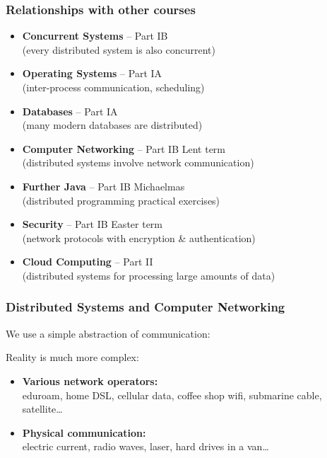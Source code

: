 \begin{frame}
    \label{s:other-courses}
    \frametitle{Relationships with other courses}
    \begin{itemize}
        \item \textbf{Concurrent Systems} -- Part IB\\
            (every distributed system is also concurrent)
        \item \textbf{Operating Systems} -- Part IA\\
            (inter-process communication, scheduling)
        \item \textbf{Databases} -- Part IA\\
            (many modern databases are distributed)
        \item \textbf{Computer Networking} -- Part IB Lent term\\
            (distributed systems involve network communication)
        \item \textbf{Further Java} -- Part IB Michaelmas\\
            (distributed programming practical exercises)
        \item \textbf{Security} -- Part IB Easter term\\
            (network protocols with encryption \& authentication)
        \item \textbf{Cloud Computing} -- Part II\\
            (distributed systems for processing large amounts of data)
    \end{itemize}
\end{frame}

\begin{frame}
    \label{s:networking}
    \frametitle{Distributed Systems and Computer Networking}
    We use a simple abstraction of communication:
    \begin{center}
    \end{center}

    Reality is much more complex:
    \begin{itemize}
        \item \textbf{Various network operators:}\\ eduroam, home DSL, cellular data, coffee shop wifi, submarine cable, satellite\dots\\[1em]
        \item \textbf{Physical communication:}\\ electric current, radio waves, laser, hard drives in a van\dots
    \end{itemize}
\end{frame}

